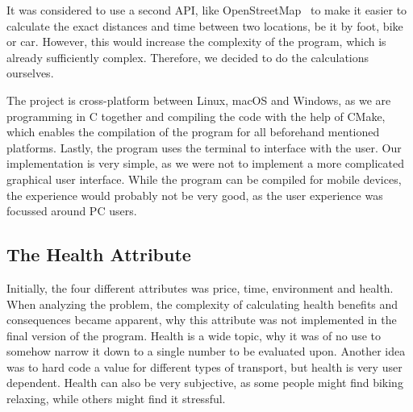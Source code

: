 It was considered to use a second API, like OpenStreetMap~\cite{openstreetmap} to make it easier to calculate the exact
distances and time between two locations, be it by foot, bike or car.
However, this would increase the complexity of the program, which is already sufficiently complex.
Therefore, we decided to do the calculations ourselves.

The project is cross-platform between Linux, macOS and Windows, as we are programming in C together and compiling the
code with the help of CMake, which enables the compilation of the program for all beforehand mentioned platforms.
Lastly, the program uses the terminal to interface with the user.
Our implementation is very simple, as we were not to implement a more complicated graphical user interface.
While the program can be compiled for mobile devices, the experience would probably not be very good, as the user
experience was focussed around PC users.

\subsection{The Health Attribute}\label{subsec:health-attribute}

Initially, the four different attributes was price, time, environment and health.
When analyzing the problem, the complexity of calculating health benefits and consequences became apparent,
why this attribute was not implemented in the final version of the program.
Health is a wide topic, why it was of no use to somehow narrow it down to a single number to be evaluated upon.
Another idea was to hard code a value for different types of transport, but health is very user dependent.
Health can also be very subjective, as some people might find biking relaxing, while others might find it stressful.
